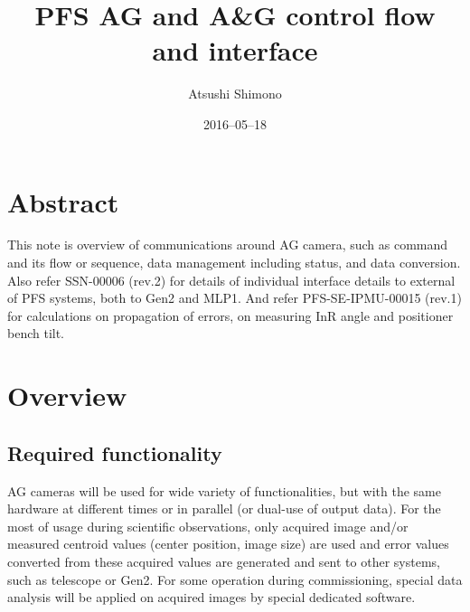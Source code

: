 \documentclass[a4paper,notitlepage]{article}
\title{PFS AG and A\&G control flow and interface}
\author{Atsushi Shimono}
\date{2016--05--18}
\begin{document}
{}

\ssnhead

\section{Abstract}

This note is overview of communications around AG camera, such as command and 
its flow or sequence, data management including status, and data conversion. 
Also refer SSN-00006 (rev.2) for details of individual interface details to 
external of PFS systems, both to Gen2 and MLP1. And refer PFS-SE-IPMU-00015 
(rev.1) for calculations on propagation of errors, on measuring InR angle and 
positioner bench tilt.

\section{Overview}

\subsection{Required functionality}

AG cameras will be used for wide variety of functionalities, but with the same 
hardware at different times or in parallel (or dual-use of output data). For 
the most of usage during scientific observations, only acquired image and/or 
measured centroid values (center position, image size) are used and error 
values converted from these acquired values are generated and sent to other 
systems, such as telescope or Gen2. For some operation during commissioning, 
special data analysis will be applied on acquired images by special dedicated 
software.
\end{document}
